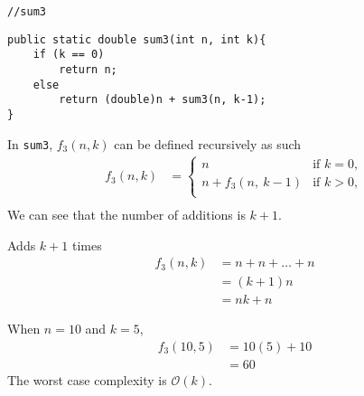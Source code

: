 \lstinline{//sum3}
\begin{lstlisting}
public static double sum3(int n, int k){
    if (k == 0)
        return n;
    else
        return (double)n + sum3(n, k-1);
}
\end{lstlisting}
In \lstinline{sum3}, $f_3(n,k)$ can be defined recursively as such
\begin{align*}
    f_3(n,k) & =
    \begin{cases}
        n              & \text{if \ } k=0, \\
        n+f_3(n,\ k-1) & \text{if \ } k>0, \\
    \end{cases} \\
\end{align*}
We can see that the number of additions is $k+1$.
\begin{center}
    Adds $k+1$ times
    \begin{align*}
        f_3(n,k) & =n+n+\ldots+n \\
                 & =(k+1)n       \\
                 & =nk+n
    \end{align*}
\end{center}
When $n=10$ and $k=5$,
\begin{align*}
    f_3(10, 5) & =10(5)+10 \\
               & =60
\end{align*}
The worst case complexity is $\mathcal{O}(k)$.
\clearpage

